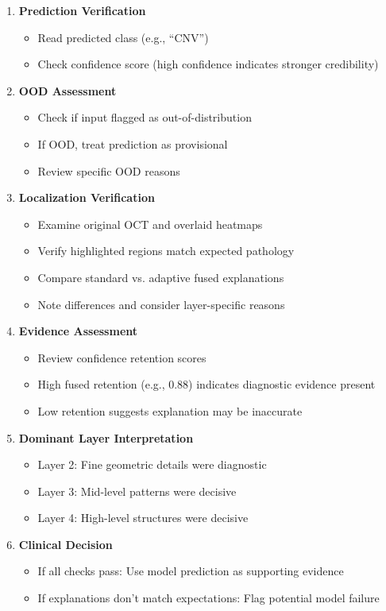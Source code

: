 \documentclass[12pt,a4paper,oneside]{book}
\begin{document}
\begin{enumerate}
  \item \textbf{Prediction Verification}
    \begin{itemize}
      \item Read predicted class (e.g., ``CNV'')
      \item Check confidence score (high confidence indicates stronger credibility)
    \end{itemize}
  
  \item \textbf{OOD Assessment}
    \begin{itemize}
      \item Check if input flagged as out-of-distribution
      \item If OOD, treat prediction as provisional
      \item Review specific OOD reasons
    \end{itemize}
  
  \item \textbf{Localization Verification}
    \begin{itemize}
      \item Examine original OCT and overlaid heatmaps
      \item Verify highlighted regions match expected pathology
      \item Compare standard vs. adaptive fused explanations
      \item Note differences and consider layer-specific reasons
    \end{itemize}
  
  \item \textbf{Evidence Assessment}
    \begin{itemize}
      \item Review confidence retention scores
      \item High fused retention (e.g., 0.88) indicates diagnostic evidence present
      \item Low retention suggests explanation may be inaccurate
    \end{itemize}
  
  \item \textbf{Dominant Layer Interpretation}
    \begin{itemize}
      \item Layer 2: Fine geometric details were diagnostic
      \item Layer 3: Mid-level patterns were decisive
      \item Layer 4: High-level structures were decisive
    \end{itemize}
  
  \item \textbf{Clinical Decision}
    \begin{itemize}
      \item If all checks pass: Use model prediction as supporting evidence
      \item If explanations don't match expectations: Flag potential model failure
    \end{itemize}
\end{enumerate}
\end{document}
